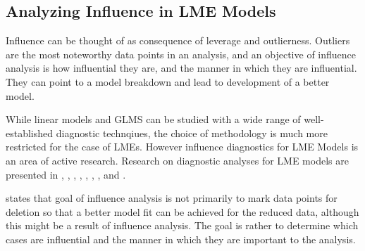 \documentclass[12pt, a4paper]{report}
\theoremstyle{definition}
\theoremstyle{remark}
\begin{document}
\subsection{Analyzing Influence in LME Models}







Influence can be thought of as consequence of leverage and outlierness. Outliers are the most noteworthy data points in an analysis, and an objective of influence analysis is how influential they are, and the manner in which they are influential. They can point to a model breakdown and lead to development of a better model.

While linear models and GLMS can be studied with a wide range of well-established diagnostic technqiues, the choice of methodology is much more restricted for the case of LMEs. However
influence diagnostics for LME Models is an area of active research. Research on diagnostic analyses for LME models are presented in \citet{Beckman}, 
\citet{Christensen}, \citet{hilden1995}, \citet{lesaffre1998local}, \citet{Banerjee1997}, 
\citet{fung2002}, \citet{Demi}, \citet{Zewotir} and \citet{NobreSinger2007, NobreSinger2011}.



\citet{schabenberger} states that goal of influence analysis is not primarily to mark data points for deletion so that a better model fit can be achieved for the reduced data, although this might be a result of influence analysis. The goal is rather to determine which cases are influential and the manner in which they are important to the analysis. 




%
\end{document}
